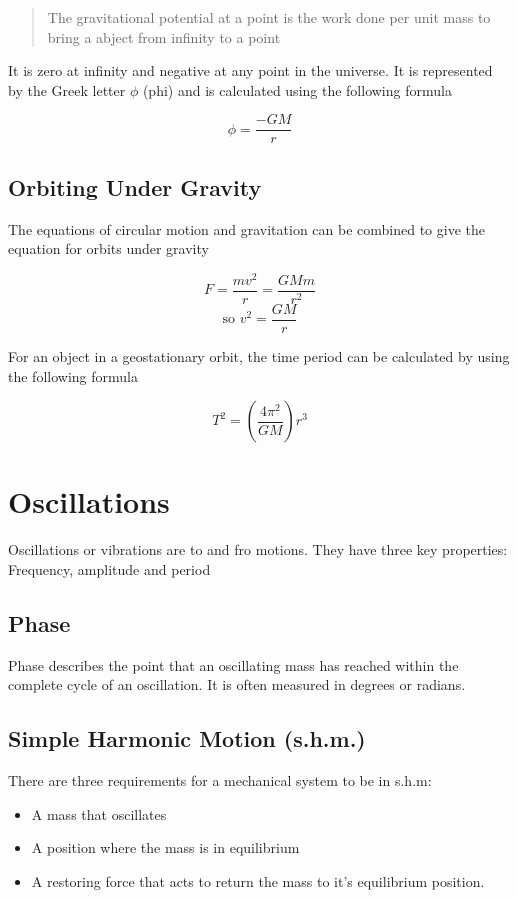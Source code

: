 \documentclass{scrbook}
\begin{document}
	\begin{quote}
		The gravitational potential at a point is the work done per unit mass to bring a abject from infinity to a point
	\end{quote}

	It is zero at infinity and negative at any point in the universe. It is represented by the Greek letter $\phi$ (phi) and is calculated using the following formula

	\[ \phi = \frac{-GM}{r} \]

\subsection{Orbiting Under Gravity}

	The equations of circular motion and gravitation can be combined to give the equation for orbits under gravity

	\[ F = \frac{mv^2}{r} = \frac{GMm}{r^2}\]
	\[ \text{so } v^2 = \frac{GM}{r}\]

	For an object in a geostationary orbit, the time period can be calculated by using the following formula

	\[ T^2 = \left(\frac{4\pi^2}{GM}\right)r^3 \]

\section{Oscillations}

	Oscillations or vibrations are to and fro motions. They have three key properties: Frequency, amplitude and period

\subsection{Phase}

	Phase describes the point that an oscillating mass has reached within the complete cycle of an oscillation. It is often measured in degrees or radians. 

\subsection{Simple Harmonic Motion (s.h.m.)}

	There are three requirements for a mechanical system to be in s.h.m:

	\begin{itemize}
		\item
			A mass that oscillates
		\item
			A position where the mass is in equilibrium 
		\item
			A restoring force that acts to return the mass to it's equilibrium position.
	\end{itemize}
\end{document}
